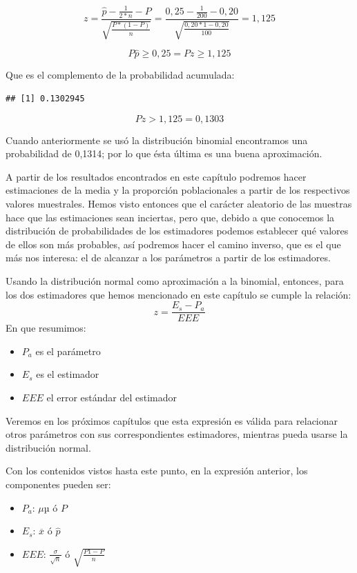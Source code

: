 \documentclass[]{book}
\providecommand{\tightlist}{%
  \setlength{\itemsep}{0pt}\setlength{\parskip}{0pt}}
\begin{document}
\[z = \frac{\widehat{p} - \frac{1}{2*n} - P}{\sqrt{\frac{P*(1 - P)}{n}}} = \frac{0,25 - \frac{1}{200} - 0,20}{\sqrt{\frac{0,20*1 - 0,20}{100}}} = 1,125\]

\[P\widehat{p} \geq 0,25 = Pz \geq 1,125\]

Que es el complemento de la probabilidad acumulada:

\begin{verbatim}
## [1] 0.1302945
\end{verbatim}

\[Pz > 1,125 = 0,1303\]

Cuando anteriormente se usó la distribución binomial encontramos una probabilidad de 0,1314; por lo que ésta última es una buena aproximación.

A partir de los resultados encontrados en este capítulo podremos hacer
estimaciones de la media y la proporción poblacionales a partir de los
respectivos valores muestrales. Hemos visto entonces que el carácter
aleatorio de las muestras hace que las estimaciones sean inciertas, pero que, debido a que conocemos la distribución de probabilidades de los estimadores podemos establecer qué valores de ellos son más probables, así podremos hacer el camino inverso, que es el que más nos interesa: el de alcanzar a los parámetros a partir de los estimadores.

Usando la distribución normal como aproximación a la binomial, entonces,
para los dos estimadores que hemos mencionado en este capítulo se cumple
la relación:
\[z=\frac{E_s-P_a}{EEE}\]
En que resumimos:

\begin{itemize}
\tightlist
\item
  \(P_a\) es el parámetro
\item
  \(E_s\) es el estimador
\item
  \(EEE\) el error estándar del estimador
\end{itemize}

Veremos en los próximos capítulos que esta expresión es válida para
relacionar otros parámetros con sus correspondientes estimadores,
mientras pueda usarse la distribución normal.

Con los contenidos vistos hasta este punto, en la expresión anterior,
los componentes pueden ser:

\begin{itemize}
\item
  \(P_a\): \(\mu\)µ ó \(P\)
\item
  \(E_s\): \(\overline{x}\) ó \(\widehat{p}\)
\item
  \(EEE\): \(\frac{\sigma}{\sqrt{n}}\) ó
  \(\sqrt{\frac{P1 - P}{n}}\)
\end{itemize}
\end{document}
